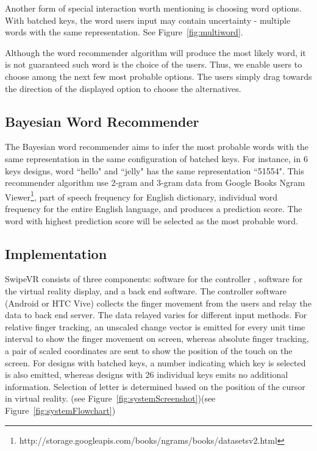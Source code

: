 Another form of special interaction worth mentioning is choosing word options.
With batched keys, the word users input may contain uncertainty - multiple words with the same representation. See Figure~\ref{fig:multiword}.

Although the word recommender algorithm will produce the most likely word, it is not guaranteed such word is the choice of the users.
Thus, we enable users to choose among the next few most probable options.
The users simply drag towards the direction of the displayed option to choose the alternatives.

\subsection{Bayesian Word Recommender}
The Bayesian word recommender aims to infer the most probable words with the same representation in the same configuration of batched keys.
For instance, in 6 keys designs, word ``hello" and ``jelly" has the same representation ``51554".
This recommender algorithm use 2-gram and 3-gram data from Google Books Ngram Viewer\footnote{http://storage.googleapis.com/books/ngrams/books/datasetsv2.html}, part of speech frequency for English dictionary, individual word frequency for the entire English language, and produces a prediction score.
The word with highest prediction score will be selected as the most probable word.

\subsection{Implementation}
SwipeVR consists of three components: software for the controller , software for the virtual reality display, and a back end software.
The controller software (Android or HTC Vive) collects the finger movement from the users and relay the data to back end server.
The data relayed varies for different input methods.
For relative finger tracking, an unscaled change vector is emitted for every unit time interval to show the finger movement on screen, whereas absolute finger tracking, a pair of scaled coordinates are sent to show the position of the touch on the screen.
For designs with batched keys, a number indicating which key is selected is also emitted, whereas designs with 26 individual keys emits no additional information.
Selection of letter is determined based on the position of the cursor in virtual reality. (see Figure~\ref{fig:systemScreenshot})(see Figure~\ref{fig:systemFlowchart})

